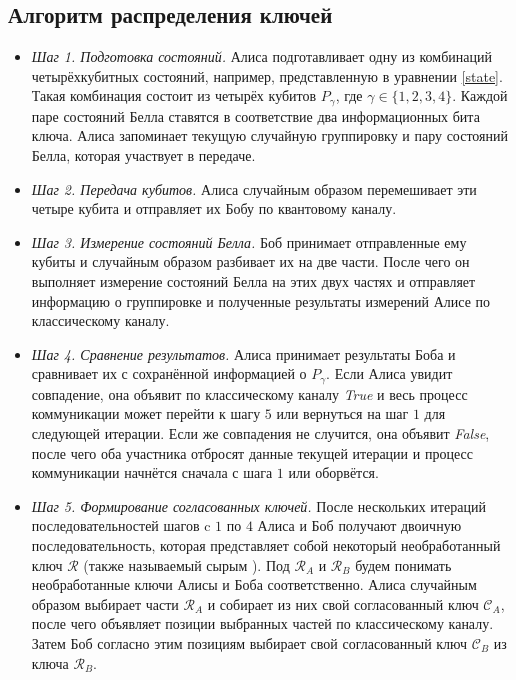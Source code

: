 \documentclass[a4paper,11pt]{article}
\begin{document}
\subsection{Алгоритм распределения ключей}

\begin{itemize}

\item \textit{Шаг 1. Подготовка состояний.} Алиса подготавливает одну из комбинаций четырёхкубитных состояний, например, представленную в уравнении \eqref{state}. Такая комбинация состоит из четырёх кубитов $P_\gamma$, где $\gamma \in \{1,2,3,4\}$. Каждой паре состояний Белла ставятся в соответствие два информационных бита ключа. 
Алиса запоминает текущую случайную группировку и пару состояний Белла, которая участвует в передаче. %

\item \textit{Шаг 2. Передача кубитов.} Алиса случайным образом перемешивает эти четыре кубита и отправляет их Бобу по квантовому каналу.

\item \textit{Шаг 3. Измерение состояний Белла.} Боб принимает отправленные ему кубиты и случайным образом разбивает их на две части. После чего он выполняет измерение состояний Белла на этих двух частях и отправляет информацию о группировке и полученные результаты измерений Алисе по классическому каналу.

\item \textit{Шаг 4. Сравнение результатов.} Алиса принимает результаты Боба и сравнивает их с сохранённой информацией о $P_\gamma$. Если Алиса увидит совпадение, она объявит по классическому каналу \textit{True} и весь процесс коммуникации может перейти к шагу $5$ или вернуться на шаг $1$ для следующей итерации. Если же совпадения не случится, она объявит \textit{False}, после чего оба участника отбросят данные текущей итерации и процесс коммуникации начнётся сначала с шага $1$ или оборвётся. 

\item \textit{Шаг 5. Формирование согласованных ключей.} После нескольких итераций последовательностей шагов c $1$ по $4$ Алиса и Боб получают двоичную последовательность, которая представляет собой некоторый необработанный ключ $\mathcal{R}$ (также называемый сырым \cite{vmk}). Под $\mathcal{R}_A$ и $\mathcal{R}_B$ будем понимать необработанные ключи Алисы и Боба соответственно. Алиса случайным образом выбирает части $\mathcal{R}_A$ и собирает из них свой согласованный ключ $\mathcal{C}_A$, после чего объявляет позиции выбранных частей по классическому каналу. Затем Боб согласно этим позициям выбирает свой согласованный ключ $\mathcal{C}_B$ из ключа $\mathcal{R}_B$.


\end{itemize}
\end{document}

